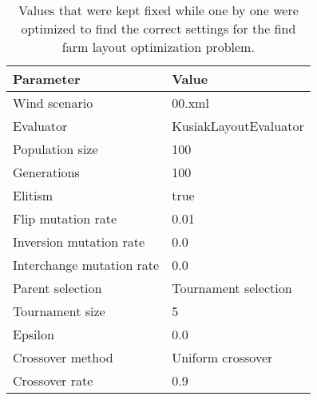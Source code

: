 \begin{table}
\centering
\caption{Values that were kept fixed while one by one were optimized to find the correct settings for the find farm layout optimization problem.}
\label{table:fixed settings}
\begin{tabular}{l|l}
\textbf{Parameter} & \textbf{Value} \\ 
\hline 
Wind scenario & 00.xml \\ 
Evaluator & KusiakLayoutEvaluator \\ 
Population size & 100 \\  
Generations & 100 \\ 
Elitism & true \\  
Flip mutation rate & 0.01 \\ 
Inversion mutation rate & 0.0 \\ 
Interchange mutation rate & 0.0 \\ 
Parent selection & Tournament selection \\ 
Tournament size & 5 \\ 
Epsilon & 0.0 \\  
Crossover method & Uniform crossover \\ 
Crossover rate & 0.9 \\ 
\end{tabular} 
\end{table}

